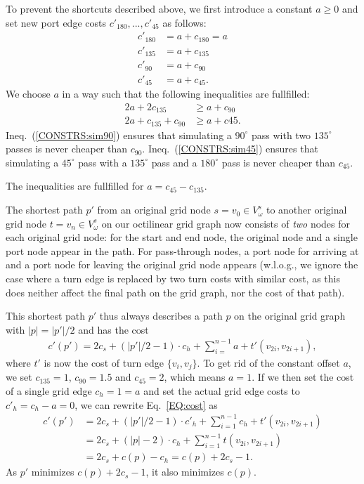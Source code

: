 \documentclass{sig-alternate-sigmod09}
\begin{document}
To prevent the shortcuts described above, we first introduce a constant $a \geq 0$ and set new port edge costs $c'_{180}, ..., c'_{45}$ as follows:
%
\begin{align}
	c'_{180} &= a + c_{180} = a \\
	c'_{135} &= a + c_{135} \\
	c'_{90} &= a + c_{90} \\
	c'_{45} &= a + c_{45}.
\end{align}
%
We choose $a$ in a way such that the following inequalities are fullfilled:
%
\begin{align}
	2a + 2c_{135} &\geq a + c_{90} \label{CONSTRS:sim90}\\
	2a + c_{135} + c_{90} &\geq a + c{45}\label{CONSTRS:sim45}.
\end{align}
Ineq.~(\ref{CONSTRS:sim90}) ensures that simulating a $90^{\circ}$ pass with two $135^{\circ}$ passes is never cheaper than $c_{90}$.
Ineq.~(\ref{CONSTRS:sim45}) ensures that simulating a $45^{\circ}$ pass with a $135^{\circ}$ pass and a $180^{\circ}$ pass is never cheaper than $c_{45}$.

The inequalities are fullfilled for $a = c_{45} - c_{135}$.

The shortest path $p'$ from an original grid node $s = v_0 \in V^s_\omega$ to another original grid node $t=v_n \in V^s_\omega$ on our octilinear grid graph now consists of \emph{two} nodes for each original grid node: for the start and end node, the original node and a single port node appear in the path.
For pass-through nodes, a port node for arriving at and a port node for leaving the original grid node appears (w.l.o.g., we ignore the case where a turn edge is replaced by two turn costs with similar cost, as this does neither affect the final path on the grid graph, nor the cost of that path).

This shortest path $p'$ thus always describes a path $p$ on the original grid graph with $|p| = |p'| / 2$ and has the cost
%
\begin{align}
	c'(p') = 2 c_s + \left(|p'| / 2 - 1\right) \cdot c_h + \sum_{i=}^{n - 1} a + t'\left(v_{2i}, v_{2i+1}\right)\label{EQ:cost},
\end{align}
where $t'$ is now the cost of turn edge $\{v_{i}, v_{j}\}$.
%
To get rid of the constant offset $a$, we set $c_{135} = 1$, $c_{90} = 1.5$ and $c_{45} = 2$, which means $a = 1$.
If we then set the cost of a single grid edge $c_h = 1 = a$ and set the actual grid edge costs to $c'_h = c_h - a = 0$, we can rewrite Eq.~\ref{EQ:cost} as  
%
\begin{align}
	c'(p') &= 2 c_s +  \left(|p'| / 2- 1\right) \cdot c'_h + \sum_{i=1}^{n - 1} c_h + t'\left(v_{2i}, v_{2i+1}\right) \\
	     &= 2 c_s + \left(|p| - 2\right) \cdot c_h + \sum_{i=1}^{n - 1} t \left(v_{2i}, v_{2i+1}\right) \\
	     &= 2 c_s + c(p) - c_h = c(p) + 2 c_s - 1.
\end{align}
%
As $p'$ minimizes $c(p) + 2 c_s - 1$, it also minimizes $c(p)$.
\end{document}
